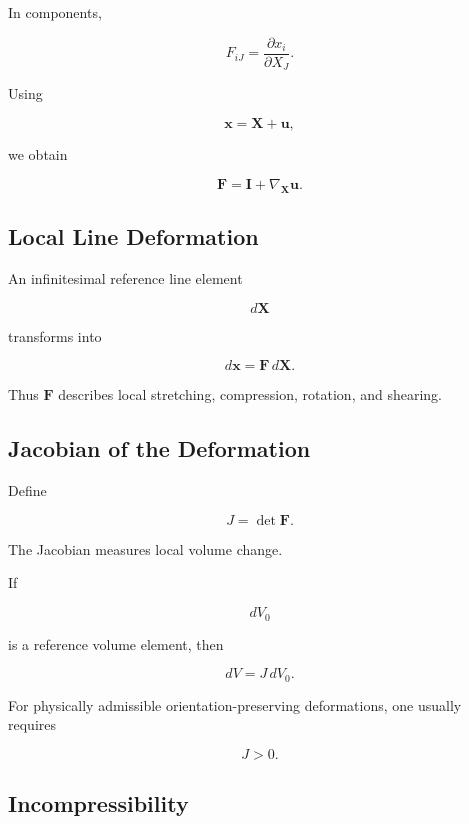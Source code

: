 In components,

\[
\boxed{
F_{iJ}
=
\frac{\partial x_i}
{\partial X_J}.
}
\]

Using

\[
\mathbf{x}
=
\mathbf{X}+\mathbf{u},
\]

we obtain

\[
\boxed{
\mathbf{F}
=
\mathbf{I}
+
\nabla_{\mathbf{X}}\mathbf{u}.
}
\]

\subsection{Local Line Deformation}
\label{subsec:local-line-deformation}

An infinitesimal reference line element

\[
d\mathbf{X}
\]

transforms into

\[
\boxed{
d\mathbf{x}
=
\mathbf{F}\,d\mathbf{X}.
}
\]

Thus \(\mathbf{F}\) describes local stretching, compression, rotation, and
shearing.

\subsection{Jacobian of the Deformation}
\label{subsec:deformation-jacobian}

Define

\[
\boxed{
J
=
\det\mathbf{F}.
}
\]

The Jacobian measures local volume change.

If

\[
dV_0
\]

is a reference volume element, then

\[
\boxed{
dV
=
J\,dV_0.
}
\]

For physically admissible orientation-preserving deformations, one usually
requires

\[
\boxed{
J>0.
}
\]

\subsection{Incompressibility}
\label{subsec:continuum-incompressibility}

